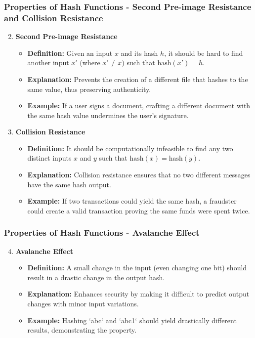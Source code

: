 \documentclass{beamer}
\begin{document}
\begin{frame}[fragile]
    \frametitle{Properties of Hash Functions - Second Pre-image Resistance and Collision Resistance}
    \begin{enumerate}
        \setcounter{enumi}{1}
        \item \textbf{Second Pre-image Resistance}
        \begin{itemize}
            \item \textbf{Definition:} Given an input \( x \) and its hash \( h \), it should be hard to find another input \( x' \) (where \( x' \neq x \)) such that \( \text{hash}(x') = h \).
            \item \textbf{Explanation:} Prevents the creation of a different file that hashes to the same value, thus preserving authenticity.
            \item \textbf{Example:} If a user signs a document, crafting a different document with the same hash value undermines the user's signature.
        \end{itemize}

        \item \textbf{Collision Resistance}
        \begin{itemize}
            \item \textbf{Definition:} It should be computationally infeasible to find any two distinct inputs \( x \) and \( y \) such that \( \text{hash}(x) = \text{hash}(y) \).
            \item \textbf{Explanation:} Collision resistance ensures that no two different messages have the same hash output.
            \item \textbf{Example:} If two transactions could yield the same hash, a fraudster could create a valid transaction proving the same funds were spent twice.
        \end{itemize}
    \end{enumerate}
\end{frame}

\begin{frame}[fragile]
    \frametitle{Properties of Hash Functions - Avalanche Effect}
    \begin{enumerate}
        \setcounter{enumi}{3}
        \item \textbf{Avalanche Effect}
        \begin{itemize}
            \item \textbf{Definition:} A small change in the input (even changing one bit) should result in a drastic change in the output hash.
            \item \textbf{Explanation:} Enhances security by making it difficult to predict output changes with minor input variations.
            \item \textbf{Example:} Hashing `abc` and `abc1` should yield drastically different results, demonstrating the property.
        \end{itemize}
    \end{enumerate}
\end{frame}
\end{document}

